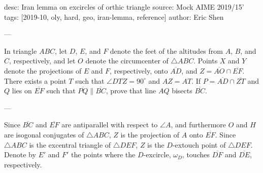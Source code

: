 desc: Iran lemma on excircles of orthic triangle
source: Mock AIME 2019/15'
tags: [2019-10, oly, hard, geo, iran-lemma, reference]
author: Eric Shen

---

In triangle $ABC$, let $D$, $E$, and $F$ denote the feet of the altitudes from $A$, $B$, and $C$, respectively, and let $O$ denote the circumcenter of $\triangle ABC$. Points $X$ and $Y$ denote the projections of $E$ and $F$, respectively, onto $\overline{AD}$, and $Z=\overline{AO}\cap\overline{EF}$. There exists a point $T$ such that $\angle DTZ=90^\circ$ and $AZ=AT$. If $P=\overline{AD}\cap\overline{ZT}$ and $Q$ lies on $\overline{EF}$ such that $\overline{PQ}\parallel\overline{BC}$, prove that line $AQ$ bisects $\overline{BC}$.

---

Since $\overline{BC}$ and $\overline{EF}$ are antiparallel with respect to $\angle A$, and furthermore $O$ and $H$ are isogonal conjugates of $\triangle ABC$, $Z$ is the projection of $A$ onto $\overline{EF}$. Since $\triangle ABC$ is the excentral triangle of $\triangle DEF$, $Z$ is the $D$-extouch point of $\triangle DEF$. Denote by $E'$ and $F'$ the points where the $D$-excircle, $\omega_D$, touches $\overline{DF}$ and $\overline{DE}$, respectively.
